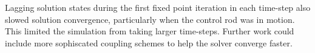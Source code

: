 Lagging solution states during the first fixed point iteration in each time-step also slowed
solution convergence, particularly when the control rod was in motion. This limited the simulation
from taking larger time-steps. Further work could include more sophiscated coupling schemes to
help the solver converge faster.


%
%
%
